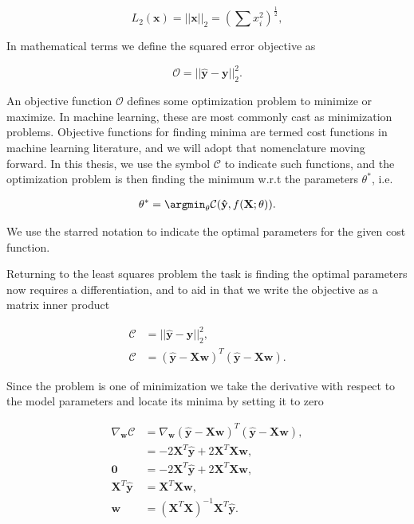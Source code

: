 $$L_2(\mathbf{x}) =||\mathbf{x}||_2 = \left(\sum x_i^2\right)^{\frac{1}{2}},$$

\noindent  In mathematical terms we define the squared error objective as

\begin{equation}
\mathcal{O} = || \mathbf{\hat{y}} - \mathbf{y} ||_2 ^2.
\end{equation}

\noindent An objective function $\mathcal{O}$ defines some optimization problem to minimize or maximize. In machine learning, these are most commonly cast as minimization problems. Objective functions for finding minima are termed cost functions in machine learning literature, and we will adopt that nomenclature moving forward. In this thesis, we use the symbol $\mathcal{C}$ to indicate such functions, and the optimization problem is then finding the minimum w.r.t the parameters $\theta^*$, i.e. 

\begin{align}\label{eq:cost}
\theta^* = \argmin_\theta \mathcal{C}(\mathbf{\hat{y}}, f(\mathbf{X}; \theta)).
\end{align}

\noindent We use the starred notation to indicate the optimal parameters for the given cost function.

Returning to the least squares problem the task is finding the optimal parameters now requires a differentiation, and to aid in that we write the objective as a matrix inner product 

\begin{align*}
\mathcal{C} &= || \mathbf{\hat{y}} - \mathbf{y} ||_2 ^2, \\
\mathcal{C} &= ( \mathbf{\hat{y}} - \mathbf{Xw})^T( \mathbf{\hat{y}} - \mathbf{Xw}).
\end{align*}

\noindent Since the problem is one of minimization we take the derivative with respect to the model parameters and locate its minima by setting it to zero 

\begin{align}
\nabla _{\mathbf{w}}\mathcal{C} &= \nabla _{\mathbf{w}} ( \mathbf{\hat{y}} - \mathbf{Xw})^T( \mathbf{\hat{y}} - \mathbf{Xw}), \\
&= -2\mathbf{X}^T\mathbf{\hat{y}} + 2\mathbf{X}^T\mathbf{X}\mathbf{w}, \\
\mathbf{0} &= -2\mathbf{X}^T\mathbf{\hat{y}} + 2\mathbf{X}^T\mathbf{X}\mathbf{w}, \\
\mathbf{X}^T\mathbf{\hat{y}} &= \mathbf{X}^T\mathbf{X}\mathbf{w}, \\
\mathbf{w} &=(\mathbf{X}^T\mathbf{X})^{-1} \mathbf{X}^T\mathbf{\hat{y}}. \label{eq:least_squares}
\end{align}

